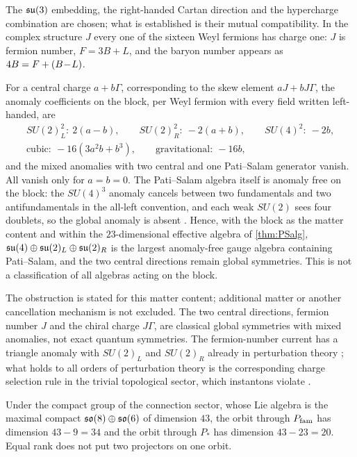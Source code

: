 The $\mathfrak{su}(3)$ embedding, the right-handed Cartan direction and the hypercharge combination are chosen; what is established is their
mutual compatibility. In the complex structure $J$ every one of the sixteen Weyl fermions has charge one: $J$ is fermion number,
$F=3B+L$, and the baryon number appears as $4B=F+(B\!-\!L)$.

\begin{proposition}
\label{prop:PSanom}
For a central charge $a+b\Gamma$, corresponding to the skew element $aJ+bJ\Gamma$, the anomaly coefficients on the block, per Weyl
fermion with every field written left-handed, are
\[
\begin{gathered}
SU(2)_L^2:\ 2(a-b),\qquad SU(2)_R^2:\ -2(a+b),\qquad SU(4)^2:\ -2b,\\
\text{cubic}:\ -16(3a^2b+b^3),\qquad \text{gravitational}:\ -16b ,
\end{gathered}
\]
and the mixed anomalies with two central and one Pati--Salam generator vanish. All vanish only for $a=b=0$. The Pati--Salam algebra itself
is anomaly free on the block: the $SU(4)^3$ anomaly cancels between two fundamentals and two antifundamentals in the all-left convention,
and each weak $SU(2)$ sees four doublets, so the global anomaly is absent \cite{Witten82}. Hence, with the block as the matter content and
within the $23$-dimensional effective algebra of \cref{thm:PSalg}, $\mathfrak{su}(4)\oplus\mathfrak{su}(2)_L\oplus\mathfrak{su}(2)_R$ is the largest anomaly-free gauge algebra
containing Pati--Salam, and the two central directions remain global symmetries. This is not a classification of all algebras acting on the
block.
\end{proposition}

The obstruction is stated for this matter content; additional matter or another cancellation mechanism is not excluded. The two central
directions, fermion number $J$ and the chiral charge $J\Gamma$, are classical global symmetries with mixed anomalies, not exact quantum
symmetries. The fermion-number current has a triangle anomaly with $SU(2)_L$ and $SU(2)_R$ already in perturbation theory \cite{Adler69}; what
holds to all orders of perturbation theory is the corresponding charge selection rule in the trivial topological sector, which instantons
violate \cite{tHooft76}.

\begin{proposition}
\label{prop:orbits}
Under the compact group of the connection sector, whose Lie algebra is the maximal compact $\mathfrak{so}(8)\oplus\mathfrak{so}(6)$ of dimension $43$, the orbit
through $P_{\rm fam}$ has dimension $43-9=34$ and the orbit through $P_*$ has dimension $43-23=20$. Equal rank does not put two projectors on
one orbit.
\end{proposition}

